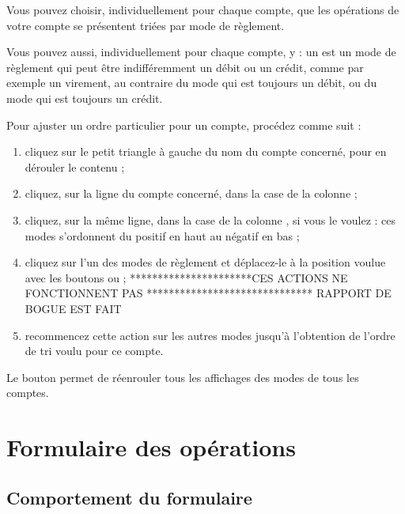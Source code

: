 Vous pouvez choisir, individuellement pour chaque compte, que les opérations de votre compte se présentent triées par mode de règlement.

Vous pouvez aussi, individuellement pour chaque compte, y  : un  est un mode de règlement qui peut être indifféremment un débit ou un crédit, comme par exemple un virement, au contraire du mode  qui est toujours un débit, ou du mode   qui est toujours un crédit. 

Pour ajuster un ordre particulier pour un compte, procédez comme suit :
\begin{enumerate}
	\item cliquez sur le petit triangle à gauche du nom du compte concerné, pour en dérouler le contenu ;
	\item cliquez, sur la ligne du compte concerné, dans la case de la colonne  ;
	\item cliquez, sur la même ligne, dans la case de la colonne , si vous le voulez : ces modes s'ordonnent du positif en haut au négatif en bas ;
	\item cliquez sur l'un des modes de règlement et déplacez-le à la position voulue avec les boutons  ou  ; **********************CES ACTIONS NE FONCTIONNENT PAS ****************************** RAPPORT DE BOGUE EST FAIT
	\item recommencez cette action sur les autres modes jusqu'à l'obtention de l'ordre de \gls{tri} voulu pour ce compte.
\end{enumerate}


Le bouton  permet de réenrouler tous les affichages des modes de tous les comptes.


\section{Formulaire des opérations\label{setup-form}}


\subsection{Comportement du formulaire\label{setup-form-behaviour}}

